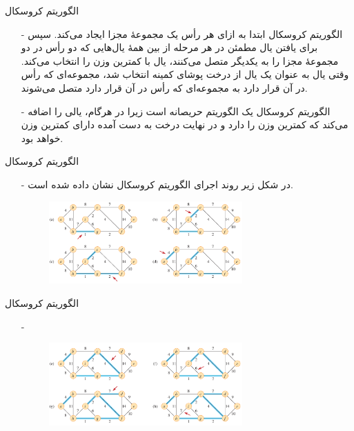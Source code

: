 
\begin{frame}{‌الگوریتم کروسکال}
\begin{itemize}\itemr
\item[-]
الگوریتم کروسکال ابتدا به ازای هر رأس یک مجموعهٔ مجزا ایجاد می‌کند. سپس برای یافتن یال مطمئن در هر مرحله از بین همهٔ یال‌هایی که دو رأس در دو مجموعهٔ مجزا را به یکدیگر متصل می‌کنند، یال
با کمترین وزن را انتخاب می‌کند.
وقتی یال
به عنوان یک یال از درخت پوشای کمینه انتخاب شد،
مجموعه‌ای که رأس 
در آن قرار دارد به مجموعه‌ای که رأس 
در آن قرار دارد متصل می‌شوند.
\item[-]
الگوریتم کروسکال یک الگوریتم حریصانه است زیرا در هرگام، یالی را اضافه می‌کند که کمترین وزن را دارد و در نهایت درخت به دست آمده دارای کمترین وزن خواهد بود.
\end{itemize}
\end{frame}



\begin{frame}{‌الگوریتم کروسکال}
\begin{itemize}\itemr
\item[-]
در شکل زیر روند اجرای الگوریتم کروسکال نشان داده شده است.
\begin{figure}
\includegraphics[width=0.7\textwidth]{figs/chap07/592-kruskal1}
\end{figure}
\end{itemize}
\end{frame}

\begin{frame}{‌الگوریتم کروسکال}
\begin{itemize}\itemr
\item[-]
\begin{figure}
\includegraphics[width=0.7\textwidth]{figs/chap07/592-kruskal2}
\end{figure}
\end{itemize}
\end{frame}

